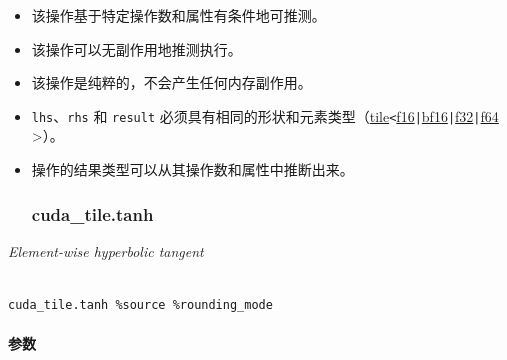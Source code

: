 \documentclass{article}
\begin{document}
\begin{itemize}
\item 该操作基于特定操作数和属性有条件地可推测。
\item 该操作可以无副作用地推测执行。
\item 该操作是纯粹的，不会产生任何内存副作用。
\item \texttt{lhs}、\texttt{rhs} 和 \texttt{result} 必须具有相同的形状和元素类型（\href{https://docs.nvidia.com/cuda/tile-ir/latest/sections/types.html#type-tile}{tile}\texttt{<}\href{https://docs.nvidia.com/cuda/tile-ir/latest/sections/types.html#subsection-element-types}{f16}\texttt{|}\href{https://docs.nvidia.com/cuda/tile-ir/latest/sections/types.html#subsection-element-types}{bf16}\texttt{|}\href{https://docs.nvidia.com/cuda/tile-ir/latest/sections/types.html#subsection-element-types}{f32}\texttt{|}\href{https://docs.nvidia.com/cuda/tile-ir/latest/sections/types.html#subsection-element-types}{f64} >）。
\item 操作的结果类型可以从其操作数和属性中推断出来。




\subsubsection{cuda\_tile.tanh}


\end{itemize}
\textit{Element-wise hyperbolic tangent}




\begin{lstlisting}

cuda_tile.tanh %source %rounding_mode

\end{lstlisting}



\paragraph{参数}
\end{document}
